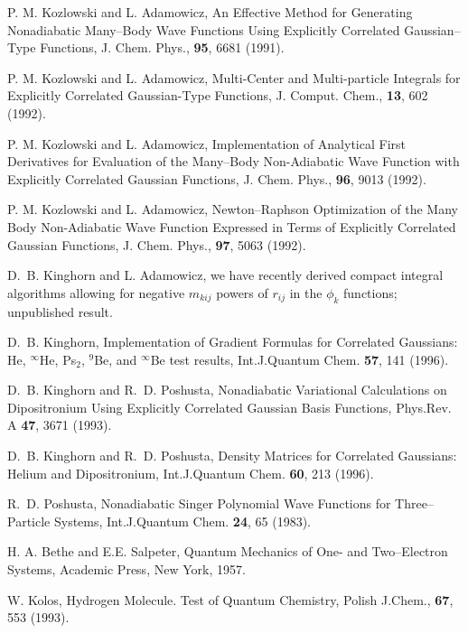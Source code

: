 \begin{thebibliography}{999}
P. M. Kozlowski and L. Adamowicz, 
An Effective Method for Generating Nonadiabatic
Many--Body Wave Functions Using Explicitly Correlated
Gaussian--Type Functions,
J. Chem. Phys., {\bf 95}, 6681 (1991).

P. M. Kozlowski and L. Adamowicz, 
Multi-Center and Multi-particle Integrals for
Explicitly Correlated Gaussian-Type Functions,
J. Comput. Chem., {\bf 13}, 602 (1992).


P. M. Kozlowski and L. Adamowicz, 
Implementation of Analytical First Derivatives for
Evaluation of the Many--Body Non-Adiabatic Wave Function
with Explicitly Correlated Gaussian Functions,
J. Chem. Phys., {\bf 96}, 9013 (1992).

P. M. Kozlowski and L. Adamowicz, 
Newton--Raphson Optimization of the Many Body
Non-Adiabatic Wave Function Expressed in Terms of Explicitly
Correlated Gaussian Functions,
J. Chem. Phys., {\bf 97}, 5063 (1992).



D.~B. Kinghorn and L. Adamowicz, we have recently derived
compact integral algorithms allowing for negative $m_{kij}$ powers
of $r_{ij}$ in the $\phi_k$ functions; unpublished result.


D.~B. Kinghorn,
Implementation of Gradient Formulas for Correlated
Gaussians: He, $^{\infty}$He, Ps$_2$, $^9$Be, and $^{\infty}$Be
test results,
\newblock Int.J.Quantum Chem. {\bf 57}, 141 (1996).

D.~B. Kinghorn and R.~D. Poshusta,
Nonadiabatic Variational Calculations on Dipositronium
Using Explicitly Correlated Gaussian Basis Functions,
\newblock Phys.Rev. A {\bf 47}, 3671 (1993).

D.~B. Kinghorn and R.~D. Poshusta,
Density Matrices for Correlated Gaussians: Helium and
Dipositronium,
\newblock Int.J.Quantum Chem. {\bf 60}, 213 (1996).

R.~D. Poshusta,
Nonadiabatic Singer Polynomial Wave Functions for 
Three--Particle Systems,
\newblock Int.J.Quantum Chem. 
{\bf 24}, 65 (1983).


H. A. Bethe and E.E. Salpeter, {\rm Quantum Mechanics of One- and
Two--Electron Systems}, Academic Press, New York, 1957.

W. Kolos, Hydrogen Molecule. Test of Quantum Chemistry,
Polish J.Chem., {\bf 67}, 553 (1993).




\end{thebibliography}
